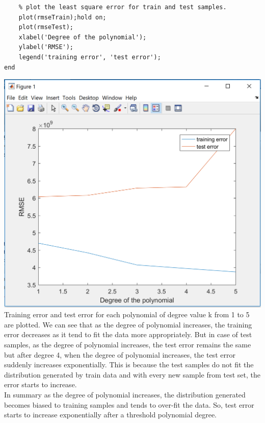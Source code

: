 \documentclass{article}
\begin{document}
\begin{itemize}
\begin{verbatim}
    % plot the least square error for train and test samples.
    plot(rmseTrain);hold on;
    plot(rmseTest);
    xlabel('Degree of the polynomial');
    ylabel('RMSE');
    legend('training error', 'test error');
end    
\end{verbatim}
\includegraphics{9_1}\\
Training error and test error for each polynomial of degree value k from 1 to 5 are plotted. We can see that as the degree of polynomial increases, the training error decreases as it tend to fit the data more appropriately. But in case of test samples, as the degree of polynomial increases, the test error remains the same but after degree 4, when the degree of polynomial increases, the test error suddenly increases exponentially. This is because the test samples do not fit the distribution generated by train data and with every new sample from test set, the error starts to increase. \\
In summary as the degree of polynomial increases, the distribution generated becomes biased to training samples and tends to over-fit the data. So, test error starts to increase exponentially after a threshold polynomial degree.
\end{itemize}
\end{document}
